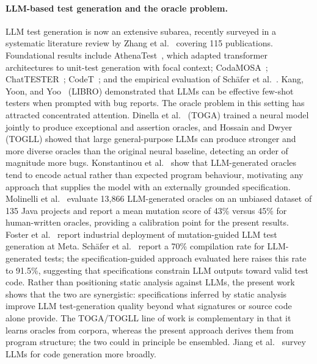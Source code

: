 \paragraph{LLM-based test generation and the oracle problem.}
LLM test generation is now an extensive subarea, recently surveyed in a systematic literature review by Zhang et al.~\cite{zhang2025llmunitsurvey} covering 115 publications. Foundational results include AthenaTest~\cite{tufano2020athenatest}, which adapted transformer architectures to unit-test generation with focal context; CodaMOSA~\cite{lemieux2023codamosa}; ChatTESTER~\cite{yuan2024chattester}; CodeT~\cite{chen2022codet}; and the empirical evaluation of Sch\"{a}fer et al.~\cite{schafer2023adaptive}. Kang, Yoon, and Yoo~\cite{kang2023libro} (LIBRO) demonstrated that LLMs can be effective few-shot testers when prompted with bug reports. The oracle problem in this setting has attracted concentrated attention. Dinella et al.~\cite{dinella2022toga} (TOGA) trained a neural model jointly to produce exceptional and assertion oracles, and Hossain and Dwyer~\cite{hossain2024togll} (TOGLL) showed that large general-purpose LLMs can produce stronger and more diverse oracles than the original neural baseline, detecting an order of magnitude more bugs. Konstantinou et al.~\cite{konstantinou2024oracles} show that LLM-generated oracles tend to encode actual rather than expected program behaviour, motivating any approach that supplies the model with an externally grounded specification. Molinelli et al.~\cite{molinelli2025oracles} evaluate 13{,}866 LLM-generated oracles on an unbiased dataset of 135 Java projects and report a mean mutation score of 43\% versus 45\% for human-written oracles, providing a calibration point for the present results. Foster et al.~\cite{foster2025meta} report industrial deployment of mutation-guided LLM test generation at Meta. Sch\"{a}fer et al.~\cite{schafer2023adaptive} report a 70\% compilation rate for LLM-generated tests; the specification-guided approach evaluated here raises this rate to 91.5\%, suggesting that specifications constrain LLM outputs toward valid test code. Rather than positioning static analysis against LLMs, the present work shows that the two are synergistic: specifications inferred by static analysis improve LLM test-generation quality beyond what signatures or source code alone provide. The TOGA/TOGLL line of work is complementary in that it learns oracles from corpora, whereas the present approach derives them from program structure; the two could in principle be ensembled. Jiang et al.~\cite{jiang2024survey} survey LLMs for code generation more broadly.

